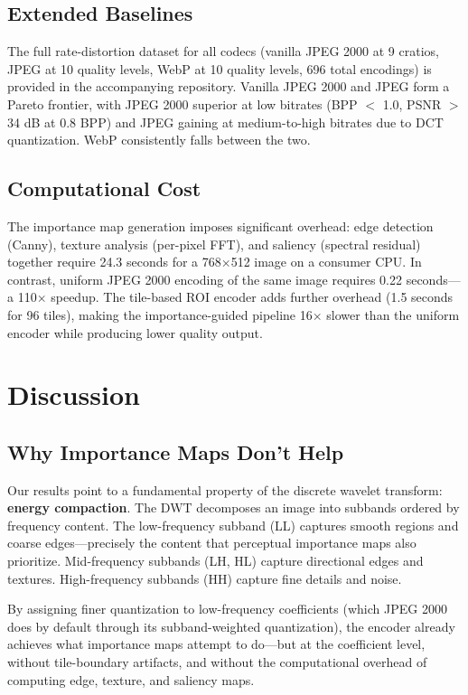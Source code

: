 \documentclass[conference]{IEEEtran}
\begin{document}
\subsection{Extended Baselines}

The full rate-distortion dataset for all codecs (vanilla JPEG 2000 at 9
cratios, JPEG at 10 quality levels, WebP at 10 quality levels, 696 total
encodings) is provided in the accompanying repository. Vanilla JPEG 2000
and JPEG form a Pareto frontier, with JPEG 2000 superior at low bitrates
(BPP $<$ 1.0, PSNR $>$ 34 dB at 0.8 BPP) and JPEG gaining at medium-to-high
bitrates due to DCT quantization. WebP consistently falls between the two.

\subsection{Computational Cost}

The importance map generation imposes significant overhead:
edge detection (Canny), texture analysis (per-pixel FFT), and saliency
(spectral residual) together require 24.3 seconds for a 768$\times$512
image on a consumer CPU. In contrast, uniform JPEG 2000 encoding of the
same image requires 0.22 seconds---a 110$\times$ speedup. The tile-based
ROI encoder adds further overhead (1.5 seconds for 96 tiles), making
the importance-guided pipeline 16$\times$ slower than the uniform encoder
while producing lower quality output.

\section{Discussion}

\subsection{Why Importance Maps Don't Help}

Our results point to a fundamental property of the discrete wavelet transform:
\textbf{energy compaction}. The DWT decomposes an image into subbands ordered
by frequency content. The low-frequency subband (LL) captures smooth regions
and coarse edges---precisely the content that perceptual importance maps also
prioritize. Mid-frequency subbands (LH, HL) capture directional edges and
textures. High-frequency subbands (HH) capture fine details and noise.

By assigning finer quantization to low-frequency coefficients (which JPEG 2000
does by default through its subband-weighted quantization), the encoder
already achieves what importance maps attempt to do---but at the coefficient
level, without tile-boundary artifacts, and without the computational overhead
of computing edge, texture, and saliency maps.
\end{document}
